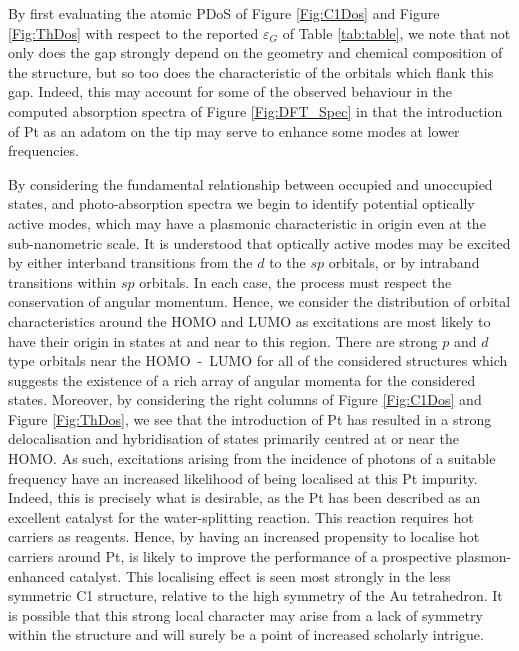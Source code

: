 By first evaluating the atomic PDoS of Figure  \ref{Fig:C1Dos} and Figure \ref{Fig:ThDos} with respect to the reported $\varepsilon_{G}$ of Table \ref{tab:table}, we note that not only does the gap strongly depend on the geometry and chemical composition of the structure, but so too does the characteristic of the orbitals which flank this gap. Indeed, this may account for some of the observed behaviour in the computed absorption spectra of Figure \ref{Fig:DFT_Spec} in that the introduction of Pt as an adatom on the tip may serve to enhance some modes at lower frequencies.

By considering the fundamental relationship between occupied and unoccupied states, and photo-absorption spectra we begin to identify potential optically active modes, which may have a plasmonic characteristic in origin even at the sub-nanometric scale. It is understood that optically active modes may be excited by either interband transitions from the $d$ to the $sp$ orbitals, or by intraband transitions within $sp$ orbitals. In each case, the process must respect the conservation of angular momentum. Hence, we consider the distribution of orbital characteristics around the HOMO and LUMO as excitations are most likely to have their origin in states at and near to this region. There are strong $p$ and $d$ type orbitals near the HOMO~-~LUMO for all of the considered structures which suggests the existence of a rich array of angular momenta for the considered states. Moreover, by considering the right columns of Figure \ref{Fig:C1Dos} and Figure \ref{Fig:ThDos}, we see that the introduction of Pt has resulted in a strong delocalisation and hybridisation of states primarily centred at or near the HOMO. As such, excitations arising from the incidence of photons of a suitable frequency have an increased likelihood of being localised at this Pt impurity. Indeed, this is precisely what is desirable, as the Pt has been described as an excellent catalyst for the water-splitting reaction. This reaction requires hot carriers as reagents. Hence, by having an increased propensity to localise hot carriers around Pt, is likely to improve the performance of a prospective plasmon-enhanced catalyst. This localising effect is seen most strongly in the less symmetric C1 structure, relative to the high symmetry of the Au tetrahedron. It is possible that this strong local character may arise from a lack of symmetry within the structure and will surely be a point of increased scholarly intrigue.

